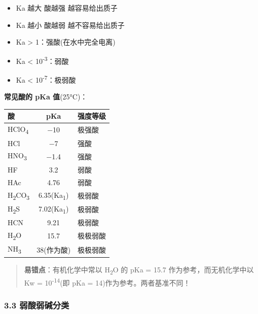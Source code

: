 \begin{itemize}
\tightlist
\item
  Ka 越大 \箭 酸越强 \箭 越容易给出质子
\item
  Ka 越小 \箭 酸越弱 \箭 越不容易给出质子
\item
  Ka \textgreater{} 1：强酸(在水中完全电离)
\item
  Ka \textless{} 10\textsuperscript{-3}：弱酸
\item
  Ka \textless{} 10\textsuperscript{-7}：极弱酸
\end{itemize}

\textbf{常见酸的 pKa 值}(25°C)：

{\def\LTcaptype{none} %
\begin{longtable}[]{@{}lcl@{}}
\toprule\noalign{}
酸 & pKa & 强度等级 \\
\midrule\noalign{}
\endhead
\bottomrule\noalign{}
\endlastfoot
HClO\textsubscript{4} & −10 & 极强酸 \\
HCl & −7 & 强酸 \\
HNO\textsubscript{3} & −1.4 & 强酸 \\
HF & 3.2 & 弱酸 \\
HAc & 4.76 & 弱酸 \\
H\textsubscript{2}CO\textsubscript{3} & 6.35(Ka\textsubscript{1}) & 极弱酸 \\
H\textsubscript{2}S & 7.02(Ka\textsubscript{1}) & 极弱酸 \\
HCN & 9.21 & 极弱酸 \\
H\textsubscript{2}O & 15.7 & 极极弱酸 \\
NH\textsubscript{3} & 38(作为酸) & 极极弱酸 \\
\end{longtable}
}

\begin{quote}
\textbf{易错点}：有机化学中常以 H\textsubscript{2}O 的 pKa = 15.7 作为参考，而无机化学中以 Kw = 10\textsuperscript{-14}(即 pKa = 14)作为参考。两者基准不同！
\end{quote}

\subsubsection{3.3 弱酸弱碱分类}\label{ux5f31ux9178ux5f31ux78b1ux5206ux7c7b}

